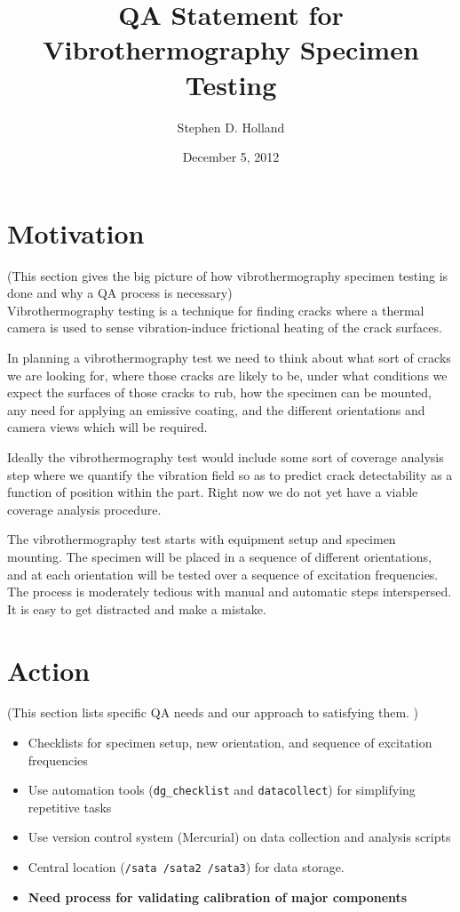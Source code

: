 \documentclass{QAstatement}
\begin{document}
\title{QA Statement for Vibrothermography Specimen Testing}
\author{Stephen D. Holland}
\date{December 5, 2012}

\maketitle

\section*{Motivation}
{\small (This section gives the big picture of how vibrothermography specimen
testing is done and why a QA process is necessary)} \\
Vibrothermography testing is a technique for finding cracks where a thermal 
camera is used to sense vibration-induce frictional heating of the crack surfaces. 

In planning a vibrothermography test we need to think about what sort of cracks 
we are looking for, where those cracks are likely to be, under what conditions 
we expect the surfaces of those cracks
to rub, how the specimen can be mounted, any need for applying an emissive coating, 
and the different orientations and 
camera views which will be required. 

Ideally the vibrothermography test would include some sort of coverage analysis 
step where we quantify the vibration field so as to predict crack detectability
as a function of position within the part. Right now we do not yet have a viable
coverage analysis procedure. 

The vibrothermography test starts with equipment setup and specimen mounting. The
specimen will be placed in a sequence of different orientations, and at 
each orientation will be tested over a sequence of excitation frequencies. 
The process is moderately tedious with manual and automatic steps interspersed. 
It is easy to get distracted and make a mistake. 

\section*{Action}
{\small (This section lists specific QA needs and our 
approach to satisfying them. )} \\
\begin{itemize}
\item Checklists for specimen setup, new orientation, and sequence of excitation frequencies
\item Use automation tools ({\tt dg\_checklist} and {\tt datacollect}) for simplifying repetitive tasks
\item Use version control system (Mercurial) on data collection and analysis scripts
\item Central location ({\tt /sata /sata2 /sata3}) for data storage.  
\item {\bf Need process for validating calibration of major components}
\end{itemize}
\end{document}
